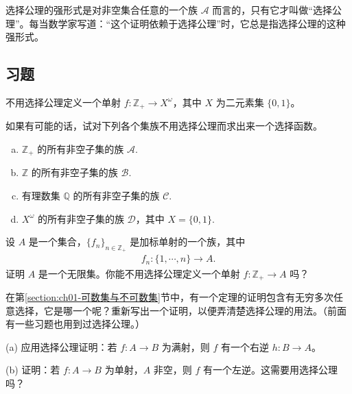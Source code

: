 \documentclass[../../main.tex]{subfiles}
\begin{document}
选择公理的强形式是对非空集合任意的一个族 $\mathcal{A}$ 而言的，只有它才叫做“选择公理”。每当数学家写道：“这个证明依赖于选择公理”时，它总是指选择公理的这种强形式。

\subsection*{习题}

\begin{exercise}\label{exercise:ch01-选择公理-1}
不用选择公理定义一个单射 $f: \mathbb{Z}_{+} \longrightarrow X^{\omega}$，其中 $X$ 为二元素集 $\{0, 1\}$。
\end{exercise}

\begin{exercise}\label{exercise:ch01-选择公理-2}
如果有可能的话，试对下列各个集族不用选择公理而求出来一个选择函数。
\begin{enumerate}[(a)]
\item $\mathbb{Z}_{+}$ 的所有非空子集的族 $\mathcal{A}$.
\item $\mathbb{Z}$ 的所有非空子集的族 $\mathcal{B}$.
\item 有理数集 $\mathbb{Q}$ 的所有非空子集的族 $\mathcal{C}$.
\item $X^{\omega}$ 的所有非空子集的族 $\mathcal{D}$，其中 $X = \{0, 1\}$.
\end{enumerate}
\end{exercise}

\begin{exercise}\label{exercise:ch01-选择公理-3}
设 $A$ 是一个集合，$\{f_{n}\}_{n \in \mathbb{Z}_{+}}$ 是加标单射的一个族，其中
\begin{align*}
f_{n}: \{1, \cdots, n\} \longrightarrow A.
\end{align*}
证明 $A$ 是一个无限集。你能不用选择公理定义一个单射 $f: \mathbb{Z}_{+} \longrightarrow A$ 吗？
\end{exercise}

\begin{exercise}\label{exercise:ch01-选择公理-4}
在第\cref{section:ch01-可数集与不可数集}节中，有一个定理的证明包含有无穷多次任意选择，它是哪一个呢？重新写出一个证明，以便弄清楚选择公理的用法。（前面有一些习题也用到过选择公理。）
\end{exercise}

\begin{exercise}\label{exercise:ch01-选择公理-5}
(a) 应用选择公理证明：若 $f: A \longrightarrow B$ 为满射，则 $f$ 有一个右逆 $h: B \longrightarrow A$。

(b) 证明：若 $f: A \longrightarrow B$ 为单射，$A$ 非空，则 $f$ 有一个左逆。这需要用选择公理吗？
\end{exercise}
\end{document}
